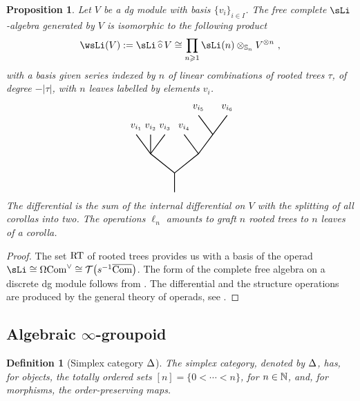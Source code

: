 \documentclass[twoside, 10pt]{amsart}
\newtheorem{definition}[lemma]{Definition}
\newtheorem{proposition}[lemma]{Proposition}
\begin{document}
\begin{proposition}
Let $V$ be a dg module with basis $\{v_i\}_{i\in I}$. The free complete $\sLi$-algebra generated by $V$ is isomorphic to the following product
\[\wsLi(V):=\sLi\, \widehat{\circ}\,  V\cong \prod_{n\geqslant 1}
\sLi(n)\otimes_{\Sy_n} V ^{\otimes n}  \ ,\]
with a basis given series indexed by  $n$ of linear combinations of rooted trees $\tau$, of degree $-|\tau|$, with $n$ leaves labelled by elements $v_i$. 
\[\vcenter{\hbox{
\begin{tikzpicture}[yscale=0.7,xscale=0.7]

\draw[thick] (-2,2)--(-1.25,1) -- (0,0) -- (0,-1);
\draw[thick] (-1.25,2) -- (-1.25,1); 
\draw[thick] (-0.5,2) -- (-1.25,1); 
\draw[thick] (0,0) -- (1.25,1) -- (2,2)--(2.75,3); 
\draw[thick] (0.5,2) -- (1.25,1); 
\draw[thick] (1.25,3) -- (2,2); 


\node at (-2,2.4) {$v_{i_1}$};
\node at (-1.25,2.4) {$v_{i_2}$};
\node at (-0.5,2.4) {$v_{i_3}$};
\node at (0.5,2.4) {$v_{i_4}$};
\node at (1.25,3.4) {$v_{i_5}$};
\node at (2.75,3.4) {$v_{i_6}$};
\end{tikzpicture}}}\]
The differential is the sum of the internal differential on $V$ with the splitting of all corollas into two. 
The operations $\ell_n$ amounts to graft $n$ rooted trees to $n$ leaves of a corolla.
\end{proposition}

\begin{proof}
The set $\mathrm{RT}$ of rooted trees provides us with a basis of the operad $\sLi\cong\Cobar \com^\vee\cong \T\big(s^{-1} \overline{\com}\big)$. The form of the complete free algebra on a discrete dg module follows from \cite[Section~2.2]{DotsenkoShadrinVallette18}. The differential and the structure operations are produced by the general theory of operads, see \cite[Section~6.5.2]{LodayVallette12}. 
\end{proof}

\subsection{Algebraic $\infty$-groupoid}



\begin{definition}[Simplex category $\mathrm{\Delta}$]
The \emph{simplex category}, denoted by $\mathrm{\Delta}$, has, for objects, the totally ordered sets 
 $[n]=\{0<  \cdots< n\}$, for  $n\in \mathbb{N}$, and, for morphisms, the order-preserving maps. 
\end{definition}
\end{document}
